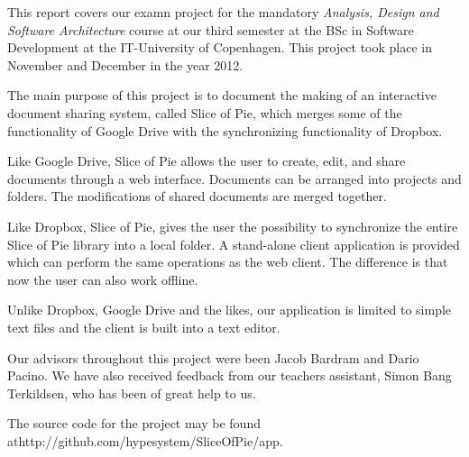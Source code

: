 This report covers our examn project for the mandatory \emph{Analysis, Design and Software Architecture} course at our third semester at the BSc in Software Development at the IT-University of Copenhagen. This project took place in November and December in the year 2012. 

The main purpose of this project is to document the making of an interactive document sharing system, called Slice of Pie, which merges some of the functionality of Google Drive with the synchronizing functionality of Dropbox.
 
Like Google Drive, Slice of Pie allows the user to create, edit, and share documents through a web interface. Documents can be arranged into projects and folders. The modifications of shared documents are merged together.

Like Dropbox, Slice of Pie, gives the user the possibility to synchronize the entire Slice of Pie library into a local folder. A stand-alone client application is provided which can perform the same operations as the web client. The difference is that now the user can also work offline.

Unlike Dropbox, Google Drive and the likes, our application is limited to simple text files and the client is built into a text editor.

Our advisors throughout this project were been Jacob Bardram and Dario Pacino.
We have also received feedback from our teachers assistant, Simon Bang Terkildsen, who has been of great help to us.

The source code for the project may be found at\newline http://github.com/hypesystem/SliceOfPie/app.